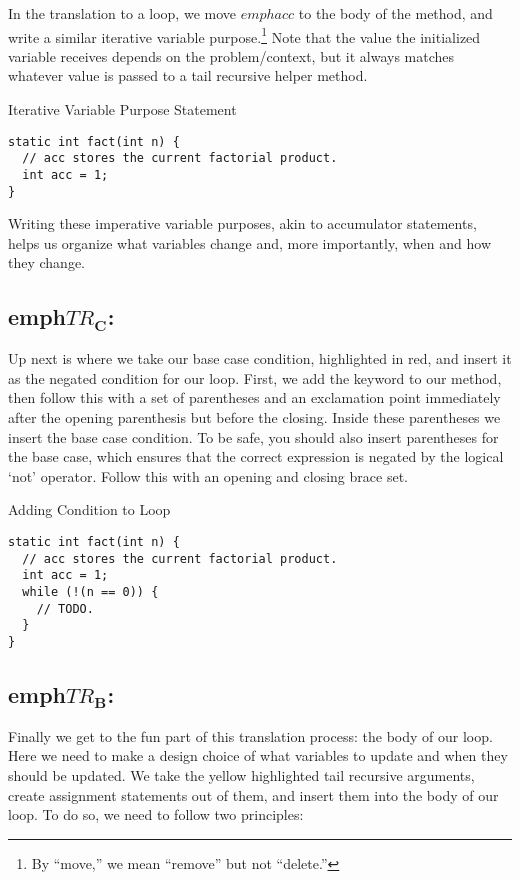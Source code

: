 In the translation to a loop, we move $emph{acc}$ to the body of the method, and write a similar iterative variable purpose.\footnote{By ``move,'' we mean ``remove'' but not ``delete.''} Note that the value the initialized variable receives depends on the problem/context, but it always matches whatever value is passed to a tail recursive helper method.

\begin{cl}[]{Iterative Variable Purpose Statement}
\begin{lstlisting}[language=MyJava]
static int fact(int n) {
  // acc stores the current factorial product. 
  int acc = 1;
}
\end{lstlisting}
\end{cl}

Writing these imperative variable purposes, akin to accumulator statements, helps us organize what variables change and, more importantly, when and how they change. 

\subsection{emph{$TR_\mathbf{C}$}:} Up next is where we take our base case condition, highlighted in red, and insert it as the negated condition for our loop. First, we add the  keyword to our method, then follow this with a set of parentheses and an exclamation point immediately after the opening parenthesis but before the closing. Inside these parentheses we insert the base case condition. To be safe, you should also insert parentheses for the base case, which ensures that the correct expression is negated by the logical `not' operator. Follow this with an opening and closing brace set.

\begin{cl}[]{Adding Condition to Loop}
\begin{lstlisting}[language=MyJava]
static int fact(int n) {
  // acc stores the current factorial product. 
  int acc = 1;
  while (!(n == 0)) { 
    // TODO.
  }
}
\end{lstlisting}
\end{cl}

\subsection{emph{$TR_\mathbf{B}$}:} Finally we get to the fun part of this translation process: the body of our loop. Here we need to make a design choice of what variables to update and when they should be updated. We take the \textcolor{darkyellow}{yellow} highlighted tail recursive arguments, create assignment statements out of them, and insert them into the body of our loop. To do so, we need to follow two principles:

